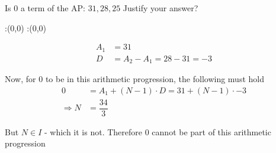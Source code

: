 



\question[4] Is $0$ a term of the AP: $31,28,25$ Justify your answer?  


\watchout

\ifprintanswers
  \begin{marginfigure}
      :(0,0)
      :(0,0)
    \figdrawbegin{}
      \figdrawline [100,101]
    \figdrawend
    \figvisu{\figBoxA}{}{%
    }
    \centerline{\box\figBoxA}
  \end{marginfigure}
\fi 

\begin{solution}[\halfpage]

     \begin{align}
        A_1 &= 31 \\ 
        D &= A_2 - A_1 = 28 - 31 = -3
	\end{align}
	
	 Now, for $0$ to be in this arithmetic progression, the following must hold 
	 \begin{align}
	 	0 &= A_1 + (N-1)\cdot D = 31 + (N-1)\cdot -3 \\
	 	\Rightarrow N &= \dfrac{34}{3}
	 \end{align}
	 
	 But $N \in I$ - which it is not. Therefore $0$ cannot be part of this arithmetic progression
\end{solution}



